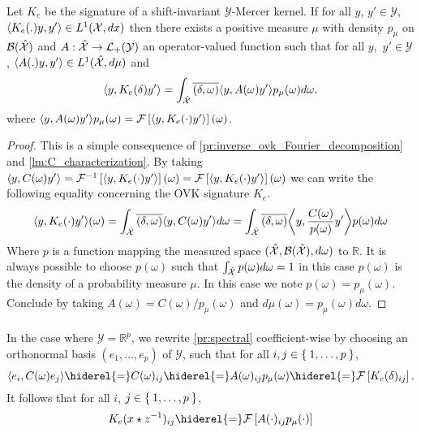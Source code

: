 \begin{proposition}
\label{pr:spectral}
Let $K_e$ be the signature of a shift-invariant $\mathcal{Y}$-Mercer kernel. If for all $y$, $y' \in\mathcal{Y}$, $\langle K_e(.)y,y'\rangle\in L^1(\mathcal{X},dx)$ then there exists a positive measure $\mu$ with density $p_{\mu}$ on $\mathcal{B}(\mathcal{\hat{\mathcal{X}}})$ and $A:\hat{\mathcal{X}}\to \mathcal{L}_+(\mathcal{Y})$ an operator-valued function such that for all $y,$ $y'\in\mathcal{Y}$, $\langle A(.)y,y'\rangle\in L^1(\hat{\mathcal{X}},d\mu)$ and
\begin{dmath*}
\inner{y, K_e(\delta)y'}=\int_{\dual{\mathcal{X}}}\conj{\pairing{\delta, \omega}}\inner{y, A(\omega)y'}p_{\mu}(\omega)d\omega.
\end{dmath*}
where $\langle y, A(\omega)y'\rangle p_{\mu}(\omega) = \mathcal{F}\left[\langle y, K_e(\cdot)y'\rangle\right](\omega)$.
\end{proposition}
\begin{proof}
This is a simple consequence of \cref{pr:inverse_ovk_Fourier_decomposition} and \cref{lm:C_characterization}. By taking $\langle y,C(\omega)y'\rangle = \mathcal{F}^{-1}\left[\langle y, K_e(\cdot)y'\rangle\right](\omega)=\mathcal{F}\left[\langle y, K_e(\cdot)y'\rangle\right](\omega)$ we can write the following equality concerning the \acs{OVK} signature $K_e$. 
\begin{dmath*}
\inner{y, K_e(\cdot)y'}(\omega)=
\int_{\dual{\mathcal{X}}}\conj{\pairing{\delta, \omega}}\inner{y, C(\omega)y'}d\omega
=\int_{\dual{\mathcal{X}}}\conj{\pairing{\delta, \omega}}\inner*{y, \frac{C(\omega)}{p(\omega)}y'}p(\omega)d\omega
\end{dmath*}
Where $p$ is a function mapping the measured space $(\hat{\mathcal{X}}, \mathcal{B}(\hat{\mathcal{X}}), d\omega)$ to $\mathbb{R}$. It is always possible to choose $p(\omega)$ such that $\int_{\hat{\mathcal{X}}}p(\omega)d\omega=1$ in this case $p(\omega)$ is the density of a probability measure $\mu$. In this case we note $p(\omega)=p_{\mu}(\omega)$. Conclude by taking $A(\omega)=C(\omega)/p_\mu(\omega)$ and $d\mu(\omega)=p_\mu(\omega)d\omega$.
\end{proof}
\paragraph{}
In the case where $\mathcal{Y}=\mathbb{R}^p$, we rewrite \cref{pr:spectral} coefficient-wise by choosing an orthonormal basis $(e_1,\ldots, e_p)$ of $\mathcal{Y}$, such that for all $ i,j\in \Set{1, \ldots, p}$,
\begin{dmath}
\label{eq:operator_identification_real}\inner{e_i,C(\omega)e_j}\hiderel{=}C(\omega)_{ij}\hiderel{=}A(\omega)_{ij}p_{\mu}(\omega)\hiderel{=}\FT{K_e(\delta)_{ij}}.
\end{dmath}
It follows that for all $i$, $j \in \Set{1, \ldots, p}$,
\begin{dmath}\label{eq:matrix-exp}
K_e(x\groupop \inv{z})_{ij} \hiderel{=} \FT{A(\cdot)_{ij}p_\mu(\cdot)}
\end{dmath}

